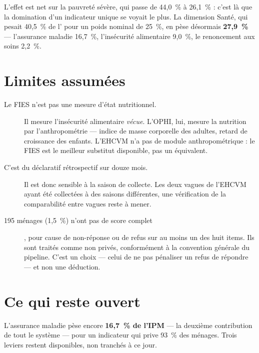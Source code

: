 \documentclass[11pt,a4paper]{article}
\begin{document}
L'effet est net sur la pauvreté sévère, qui passe de 44,0~\% à 26,1~\% : c'est là que la
domination d'un indicateur unique se voyait le plus. La dimension Santé, qui pesait 40,5~\% de
l'\ipm{} pour un poids nominal de 25~\%, en pèse désormais \textbf{27,9~\%} --- l'assurance
maladie 16,7~\%, l'insécurité alimentaire 9,0~\%, le renoncement aux soins 2,2~\%.

\section{Limites assumées}

\begin{description}
  \item[Le FIES n'est pas une mesure d'état nutritionnel.] Il mesure l'insécurité alimentaire
  \emph{vécue}. L'OPHI, lui, mesure la nutrition par l'anthropométrie --- indice de masse
  corporelle des adultes, retard de croissance des enfants. L'EHCVM n'a pas de module
  anthropométrique : le FIES est le meilleur substitut disponible, pas un équivalent.

  \item[C'est du déclaratif rétrospectif sur douze mois.] Il est donc sensible à la saison de
  collecte. Les deux vagues de l'EHCVM ayant été collectées à des saisons différentes, une
  vérification de la comparabilité entre vagues reste à mener.

  \item[195 ménages (1,5~\%) n'ont pas de score complet], pour cause de non-réponse ou de refus
  sur au moins un des huit items. Ils sont traités comme non privés, conformément à la convention
  générale du pipeline. C'est un choix --- celui de ne pas pénaliser un refus de répondre --- et
  non une déduction.
\end{description}

\section{Ce qui reste ouvert}

\begin{attention}[$H = 58{,}0~\%$ demeure au-dessus de l'ordre de grandeur de référence]
L'assurance maladie pèse encore \textbf{16,7~\% de l'IPM} --- la deuxième contribution de tout le
système --- pour un indicateur qui prive 93~\% des ménages. Trois leviers restent disponibles, non
tranchés à ce jour.
\end{attention}
\end{document}
